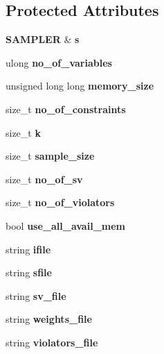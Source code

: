 \subsection*{Protected Attributes}
\begin{CompactItemize}
\item 
{\bf SAMPLER} \& \textbf{s}\label{classRND__SVM_2eb0213fec205a4944c24f167bd1de95}

\item 
ulong \textbf{no\_\-of\_\-variables}\label{classRND__SVM_9329a0992dd6f3c20e5127bc6cf7e43d}

\item 
unsigned long long \textbf{memory\_\-size}\label{classRND__SVM_732caf93333e1ea61bc12acfe04d54a8}

\item 
size\_\-t \textbf{no\_\-of\_\-constraints}\label{classRND__SVM_1b47bb0c32f8fb0e984a081ad73688b1}

\item 
size\_\-t \textbf{k}\label{classRND__SVM_3f07db31b6084077538d8b72ba13838a}

\item 
size\_\-t \textbf{sample\_\-size}\label{classRND__SVM_1773f7c387ea3f64fcf5638f56a2db07}

\item 
size\_\-t \textbf{no\_\-of\_\-sv}\label{classRND__SVM_a2d670fd9518688af82fd9c45eaa5846}

\item 
size\_\-t \textbf{no\_\-of\_\-violators}\label{classRND__SVM_59d353c6befe0f2a919290d94580905a}

\item 
bool \textbf{use\_\-all\_\-avail\_\-mem}\label{classRND__SVM_a3fd7ddc02535a226288b1cfbc2c6967}

\item 
string \textbf{ifile}\label{classRND__SVM_a4838da23df5f3e07165ef89a0b1793b}

\item 
string \textbf{sfile}\label{classRND__SVM_9eb81213eb0649b2f3c43eac5da0b753}

\item 
string \textbf{sv\_\-file}\label{classRND__SVM_de60d0170d48ff6851f88a44580636c0}

\item 
string \textbf{weights\_\-file}\label{classRND__SVM_8a47362621df9365aedf834e0d6e03ce}

\item 
string \textbf{violators\_\-file}\label{classRND__SVM_de16716df887cf7dc5f05127b6464ed3}


\end{CompactItemize}

